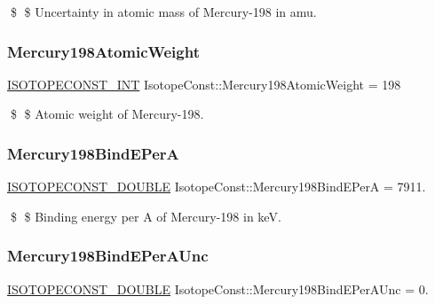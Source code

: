 \$ \$ Uncertainty in atomic mass of Mercury-\/198 in amu. \mbox{\label{group___isotope_const-_mercury-_hg198_gaf79b1818f60f8931a6afe5ef8ccdd628}} 
\subsubsection{\texorpdfstring{Mercury198\+Atomic\+Weight}{Mercury198AtomicWeight}}
{\footnotesize\ttfamily \mbox{\hyperlink{group___isotope_const-_macros_ga5f18360b3e99483a35c32d789e62621c}{I\+S\+O\+T\+O\+P\+E\+C\+O\+N\+S\+T\+\_\+\+I\+NT}} Isotope\+Const\+::\+Mercury198\+Atomic\+Weight = 198}

\$ \$ Atomic weight of Mercury-\/198. \mbox{\label{group___isotope_const-_mercury-_hg198_gaafd1d77f90730f3fe830d0163eb5ba05}} 
\subsubsection{\texorpdfstring{Mercury198\+Bind\+E\+PerA}{Mercury198BindEPerA}}
{\footnotesize\ttfamily \mbox{\hyperlink{group___isotope_const-_macros_ga8f45a7272ce02c0b4c65c44636ed719a}{I\+S\+O\+T\+O\+P\+E\+C\+O\+N\+S\+T\+\_\+\+D\+O\+U\+B\+LE}} Isotope\+Const\+::\+Mercury198\+Bind\+E\+PerA = 7911.}

\$ \$ Binding energy per A of Mercury-\/198 in keV. \mbox{\label{group___isotope_const-_mercury-_hg198_gaa326d8f171e72cd98854b1e2cba68446}} 
\subsubsection{\texorpdfstring{Mercury198\+Bind\+E\+Per\+A\+Unc}{Mercury198BindEPerAUnc}}
{\footnotesize\ttfamily \mbox{\hyperlink{group___isotope_const-_macros_ga8f45a7272ce02c0b4c65c44636ed719a}{I\+S\+O\+T\+O\+P\+E\+C\+O\+N\+S\+T\+\_\+\+D\+O\+U\+B\+LE}} Isotope\+Const\+::\+Mercury198\+Bind\+E\+Per\+A\+Unc = 0.}

